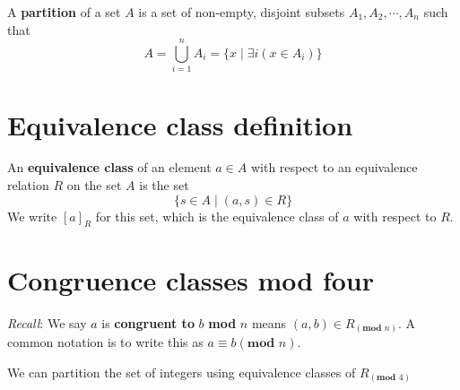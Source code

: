\documentclass[12pt, oneside]{article}
\begin{document}
A {\bf partition} of a set $A$ is a set of non-empty, disjoint subsets 
$A_1, A_2, \cdots, A_n$ such that 
\[
    A = \bigcup_{i=1}^{n} A_i = \{ x \mid \exists i (x \in A_i) \}
\] \vfill
\section*{Equivalence class definition}


An {\bf equivalence class} of an element $a \in A$ 
with respect to an equivalence relation $R$ on the set $A$ is the set 
\[
    \{s \in A \mid (a, s) \in R \}
\] 
We write $[a]_R$ for this set, which is the equivalence class of $a$ with respect to $R$. \vfill
\section*{Congruence classes mod four}


{\it Recall}: We say $a$ is {\bf congruent to} $b$ \textbf{mod} $n$ 
means $(a, b) \in R_{(\textbf{mod } n)}$. 
A common notation is to write this as $a \equiv b (\textbf{mod } n)$.

We can partition the set of integers using equivalence classes of  $R_{(\textbf{mod } 4)}$
\end{document}
